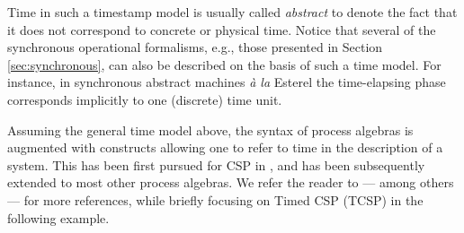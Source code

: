Time in such a timestamp model is usually called \emph{abstract} 
to denote the fact that it does not correspond to concrete or 
physical time. Notice that several of the synchronous operational 
formalisms, e.g., those presented in Section \ref{sec:synchronous}, can also 
be described on the basis of such a time model. For instance, 
in synchronous abstract machines \emph{\`{a} la} Esterel \cite{BG92} the 
time-elapsing phase corresponds implicitly to one (discrete) 
time unit.

Assuming the general time model above, the syntax of process 
algebras is augmented with constructs allowing one to  
refer to  time in the description of a system. This 
has been first pursued for CSP in \cite{RR88}, and has been subsequently 
extended to most other process algebras. We refer the reader 
to \cite{BM02,NS91,Bae03} --- among others --- for more references, 
while briefly focusing on Timed CSP (TCSP) in the following example.

